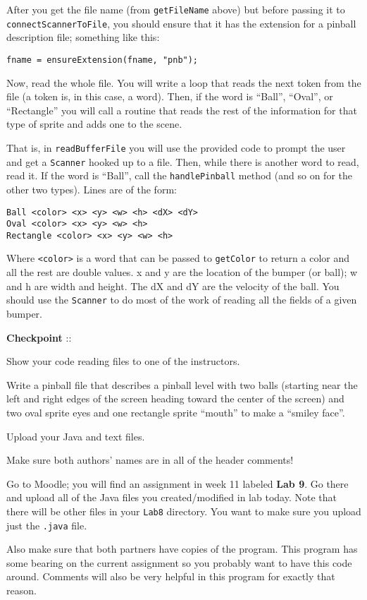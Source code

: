 \documentclass[12pt,oneside]{memoir}
\newcommand\code[1]{\lstinline^#1^}
\newcommand\fname[1]{\texttt{#1}}
\newcounter{LabPhase}
\newenvironment{LabExercises}{%
\renewcommand{\ExerciseListName}{Question}%
\renewcommand{\ExerciseListHeader}{\textbf{%
   Phase\ExerciseHeaderNB. }}
\begin{ExerciseList}}%
{\end{ExerciseList}}
\newcommand{\LabExercise}{\Exercise[name={Lab Phase\ExerciseHeaderNB},counter={LabPhase}]}
\newcounter{CheckPoint}
\newcommand{\Checkpoint}{\textbf{Checkpoint \theCheckPoint }:: \addtocounter{CheckPoint}{1}}
\begin{document}
\begin{LabExercises}
After you get the file name (from \code{getFileName} above) but before
passing it to \code{connectScannerToFile}, you should ensure that it
has the extension for a pinball description file; something like this:

\begin{lstlisting}
fname = ensureExtension(fname, "pnb");
\end{lstlisting}


\LabExercise Now, read the whole file. You will write a loop that
reads the next token from the file (a token is, in this case, a
word). Then, if the word is ``Ball'', ``Oval'', or ``Rectangle'' you
will call a routine that reads the rest of the information for that
type of sprite and adds one to the scene.

That is, in \code{readBufferFile} you will use the provided code to
prompt the user and get a \code{Scanner} hooked up to a file. Then,
while there is another word to read, read it. If the word is ``Ball'',
call the \code{handlePinball} method (and so on for the other two
types). Lines are of the form:

\begin{lstlisting}
Ball <color> <x> <y> <w> <h> <dX> <dY>
Oval <color> <x> <y> <w> <h>
Rectangle <color> <x> <y> <w> <h>
\end{lstlisting}

Where \code{<color>} is a word that can be passed to \code{getColor}
to return a color and all the rest are double values. x and y are the
location of the bumper (or ball); w and h are width and height. The dX
and dY are the velocity of the ball. You should use the \code{Scanner}
to do most of the work of reading all the fields of a given bumper.

\Checkpoint Show your code reading files to one of the instructors.

\LabExercise Write a pinball file that describes a pinball level with
two balls (starting near the left and right edges of the screen
heading toward the center of the screen) and two oval sprite eyes and
one rectangle sprite ``mouth'' to make a ``smiley face''.

\LabExercise Upload your Java and text files.

Make sure both authors' names are in all of the header comments!

Go to Moodle; you will find an assignment in week 11 labeled
\textbf{Lab 9}. Go there and upload all of the Java files you
created/modified in lab today. Note that there will be other files in
your \fname{Lab8} directory. You want to make sure you upload just the
\fname{.java} file.

Also make sure that both partners have copies of the program. This
program has some bearing on the current assignment so you probably
want to have this code around. Comments will also be very helpful in
this program for exactly that reason.

\end{LabExercises}
\end{document}
